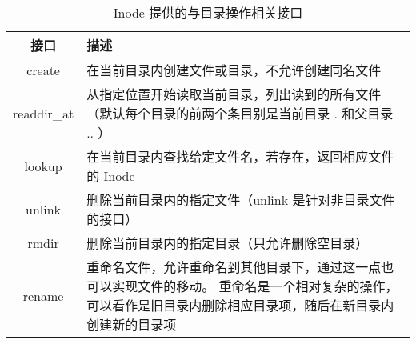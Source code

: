 \begin{table}[h]
    \centering
    \begin{tabularx}{\textwidth}{|c|Y|}
    \hline
    接口 & 描述 \\
    \hline
    create & 在当前目录内创建文件或目录，不允许创建同名文件\\
    \hline
    readdir\_at & 从指定位置开始读取当前目录，列出读到的所有文件
    （默认每个目录的前两个条目别是当前目录 . 和父目录 .. ）\\
    \hline
    lookup & 在当前目录内查找给定文件名，若存在，返回相应文件的 Inode\\
    \hline
    unlink & 删除当前目录内的指定文件（unlink 是针对非目录文件的接口）\\
    \hline
    rmdir & 删除当前目录内的指定目录（只允许删除空目录）\\
    \hline
    rename & 重命名文件，允许重命名到其他目录下，通过这一点也可以实现文件的移动。
    重命名是一个相对复杂的操作，可以看作是旧目录内删除相应目录项，随后在新目录内创建新的目录项\\
    \hline
    \end{tabularx}
    \caption{Inode 提供的与目录操作相关接口}
    \label{tab:dir}
\end{table}
